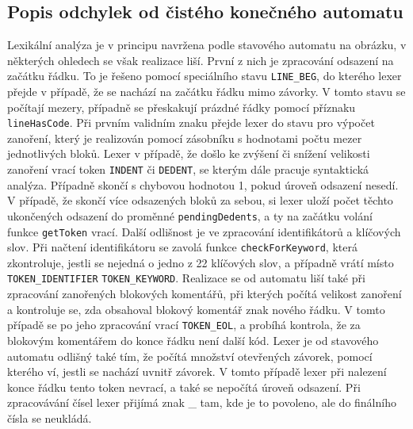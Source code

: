 \documentclass[12pt, a4paper]{article}
\begin{document}
\subsection*{Popis odchylek od čistého konečného automatu}
Lexikální analýza je v principu navržena podle stavového automatu na obrázku, v některých ohledech se však realizace liší. První z nich je zpracování odsazení na začátku řádku. To je řešeno pomocí speciálního stavu \texttt{LINE\_BEG}, do kterého lexer přejde v případě, že se nachází na začátku řádku mimo závorky. V tomto stavu se počítají mezery, případně se přeskakují prázdné řádky pomocí příznaku \texttt{lineHasCode}. Při prvním validním znaku přejde lexer do stavu pro výpočet zanoření, který je realizován pomocí zásobníku s hodnotami počtu mezer jednotlivých bloků. Lexer v případě, že došlo ke zvýšení či snížení velikosti zanoření vrací token \texttt{INDENT} či \texttt{DEDENT}, se kterým dále pracuje syntaktická analýza. Případně skončí s chybovou hodnotou 1, pokud úroveň odsazení nesedí. 
V případě, že skončí více odsazených bloků za sebou, si lexer uloží počet těchto ukončených odsazení do proměnné \texttt{pendingDedents}, a ty na začátku volání funkce \texttt{getToken} vrací.
Další odlišnost je ve zpracování identifikátorů a klíčových slov. Při načtení identifikátoru se zavolá funkce \texttt{checkForKeyword}, která zkontroluje, jestli se nejedná o jedno z 22 klíčových slov, a případně vrátí místo \texttt{TOKEN\_IDENTIFIER} \texttt{TOKEN\_KEYWORD}. 
Realizace se od automatu liší také při zpracování zanořených blokových komentářů, při kterých počítá velikost zanoření a kontroluje se, zda obsahoval blokový komentář znak nového řádku. V tomto případě se po jeho zpracování vrací \texttt{TOKEN\_EOL}, a probíhá kontrola, že za blokovým komentářem do konce řádku není další kód.
Lexer je od stavového automatu odlišný také tím, že počítá množství otevřených závorek, pomocí kterého ví, jestli se nachází uvnitř závorek. V tomto případě lexer při nalezení konce řádku tento token nevrací, a také se nepočítá úroveň odsazení. Při zpracovávání čísel lexer přijímá znak \_ tam, kde je to povoleno, ale do finálního čísla se neukládá.
\newpage
\end{document}
